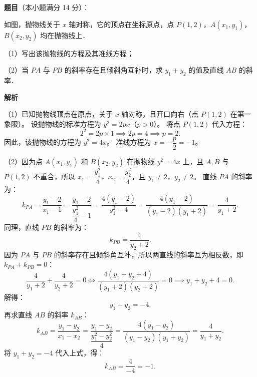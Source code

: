 \begin{answer}

\textbf{题目}（本小题满分 14 分）：

如图，抛物线关于 $x$ 轴对称，它的顶点在坐标原点，点 $P(1, 2)$，$A(x_1, y_1)$，$B(x_2, y_2)$ 均在抛物线上．

（1）写出该抛物线的方程及其准线方程；

（2）当 $PA$ 与 $PB$ 的斜率存在且倾斜角互补时，求 $y_1+y_2$ 的值及直线 $AB$ 的斜率．
\nopagebreak[4]
\begin{center}\end{center}
\nopagebreak[4]
\textbf{解析}

（1）已知抛物线顶点在原点，关于 $x$ 轴对称，且开口向右（点 $P(1, 2)$ 在第一象限）。
设抛物线的标准方程为 $y^2=2px$（$p>0$）。
将点 $P(1, 2)$ 代入方程：
\nopagebreak[4]
\[
2^2=2p\times 1\implies 2p=4\implies p=2.
\]
因此，该抛物线的方程为 $y^2=4x$。
准线方程为 $x=-\dfrac{p}{2}=-1$。

（2）因为点 $A(x_1, y_1)$ 和 $B(x_2, y_2)$ 在抛物线 $y^2=4x$ 上，且 $A, B$ 与 $P(1, 2)$ 不重合，所以 $x_1=\dfrac{y_1^2}{4}$，$x_2=\dfrac{y_2^2}{4}$，且 $y_1\neq 2$，$y_2\neq 2$。
直线 $PA$ 的斜率为：
\nopagebreak[4]
\[
k_{PA}=\frac{y_1-2}{x_1-1}=\frac{y_1-2}{\dfrac{y_1^2}{4}-1}=\frac{4(y_1-2)}{y_1^2-4}=\frac{4(y_1-2)}{(y_1-2)(y_1+2)}=\frac{4}{y_1+2}.
\]
同理，直线 $PB$ 的斜率为：
\nopagebreak[4]
\[
k_{PB}=\frac{4}{y_2+2}.
\]
因为 $PA$ 与 $PB$ 的斜率存在且倾斜角互补，所以两直线的斜率互为相反数，即 $k_{PA}+k_{PB}=0$：
\nopagebreak[4]
\[
\frac{4}{y_1+2}+\frac{4}{y_2+2}=0\iff \frac{4(y_1+y_2+4)}{(y_1+2)(y_2+2)}=0\implies y_1+y_2+4=0.
\]
解得：
\nopagebreak[4]
\[
y_1+y_2=-4.
\]
再求直线 $AB$ 的斜率 $k_{AB}$：
\nopagebreak[4]
\[
k_{AB}=\frac{y_1-y_2}{x_1-x_2}=\frac{y_1-y_2}{\dfrac{y_1^2-y_2^2}{4}}=\frac{4(y_1-y_2)}{(y_1-y_2)(y_1+y_2)}=\frac{4}{y_1+y_2}.
\]
将 $y_1+y_2=-4$ 代入上式，得：
\nopagebreak[4]
\[
k_{AB}=\frac{4}{-4}=-1.
\]


\end{answer}
